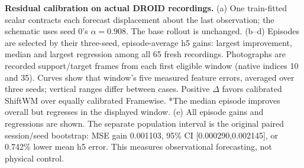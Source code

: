 \textbf{Residual calibration on actual DROID recordings.}
(a) One train-fitted scalar contracts each forecast displacement about the last observation; the schematic uses seed 0's $\alpha=0.908$. The base rollout is unchanged.
(b--d) Episodes are selected by their three-seed, episode-average h5 gains: largest improvement, median and largest regression among all 65 fresh recordings. Photographs are recorded support/target frames from each first eligible window (native indices 10 and 35). Curves show that window's five measured feature errors, averaged over three seeds; vertical ranges differ between cases. Positive $\Delta$ favors calibrated ShiftWM over equally calibrated Framewise. *The median episode improves overall but regresses in the displayed window. 
(e) All episode gains and regressions are shown. The separate population interval is the original paired session/seed bootstrap: MSE gain 0.001103, 95\% CI [0.000290,0.002145], or 0.742\% lower mean h5 error. This measures observational forecasting, not physical control.
